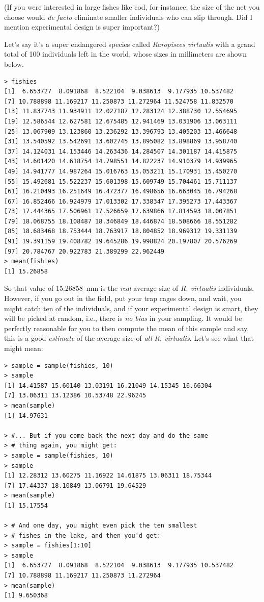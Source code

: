\documentclass{report}
\newcommand{\species}[1]{\textit{#1}}
\begin{document}
			(If you were interested in large fishes like cod, for instance, the size of the net you choose would \emph{de facto} eliminate smaller individuals who can slip through. Did I mention experimental design is super important?)
			
			Let's say it's a super endangered species called \species{Raropisces virtualis} with a grand total of 100 individuals left in the world, whose sizes in millimeters are shown below.
		
			\begin{verbatim}
> fishies
[1]  6.653727  8.091868  8.522104  9.038613  9.177935 10.537482
[7] 10.788898 11.169217 11.250873 11.272964 11.524758 11.832570
[13] 11.837743 11.934911 12.027187 12.283124 12.388730 12.554695
[19] 12.586544 12.627581 12.675485 12.941469 13.031906 13.063111
[25] 13.067909 13.123860 13.236292 13.396793 13.405203 13.466648
[31] 13.540592 13.542691 13.602745 13.895082 13.898869 13.958740
[37] 14.124031 14.153446 14.263436 14.284507 14.301187 14.415875
[43] 14.601420 14.618754 14.798551 14.822237 14.910379 14.939965
[49] 14.941777 14.987264 15.016763 15.053211 15.170931 15.450270
[55] 15.492681 15.522237 15.601398 15.609749 15.704461 15.711137
[61] 16.210493 16.251649 16.472377 16.498656 16.663045 16.794268
[67] 16.852466 16.924979 17.013302 17.338347 17.395273 17.443367
[73] 17.444365 17.506961 17.526659 17.639866 17.814593 18.007851
[79] 18.068755 18.108487 18.346849 18.446874 18.508666 18.551282
[85] 18.683468 18.753444 18.763917 18.804852 18.969312 19.331139
[91] 19.391159 19.408782 19.645286 19.998824 20.197807 20.576269
[97] 20.784767 20.922783 21.389299 22.962449
> mean(fishies)
[1] 15.26858
			\end{verbatim}
			
			So that value of 15.26858~mm is the \emph{real} average size of \species{R. virtualis} individuals. However, if you go out in the field, put your trap cages down, and wait, you might catch ten of the individuals, and if your experimental design is smart, they will be picked at random, i.e., there is \emph{no bias} in your sampling. It would be perfectly reasonable for you to then compute the mean of this sample and say, this is a good \emph{estimate} of the average size of \emph{all} \species{R. virtualis}. Let's see what that might mean:
			
			\begin{verbatim}
> sample = sample(fishies, 10)
> sample
[1] 14.41587 15.60140 13.03191 16.21049 14.15345 16.66304
[7] 13.06311 13.12386 10.53748 22.96245
> mean(sample)
[1] 14.97631

> #... But if you come back the next day and do the same
> # thing again, you might get:
> sample = sample(fishies, 10)
> sample
[1] 12.28312 13.60275 11.16922 14.61875 13.06311 18.75344
[7] 17.44337 18.10849 13.06791 19.64529
> mean(sample)
[1] 15.17554

> # And one day, you might even pick the ten smallest
> # fishes in the lake, and then you'd get:
> sample = fishies[1:10]
> sample
[1]  6.653727  8.091868  8.522104  9.038613  9.177935 10.537482
[7] 10.788898 11.169217 11.250873 11.272964
> mean(sample)
[1] 9.650368
			\end{verbatim}
			
\end{document}
